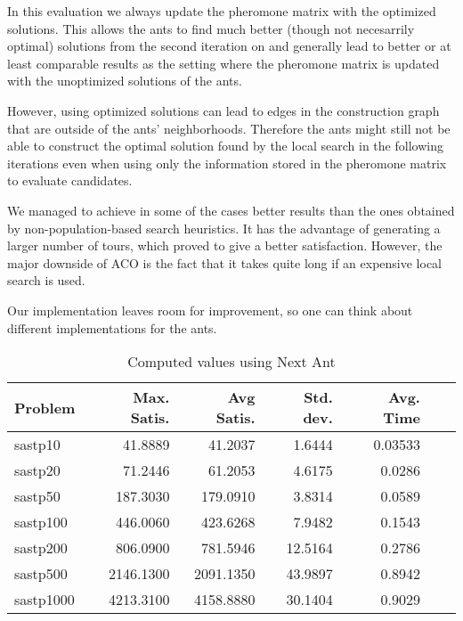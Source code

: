 \documentclass{article}
\begin{document}
In this evaluation we always update the pheromone matrix with the optimized solutions. This allows the ants to find much better (though not
necesarrily optimal) solutions from the second iteration on and generally lead to better or at least comparable results as the setting where
the pheromone matrix is updated with the unoptimized solutions of the ants.

However, using optimized solutions can lead to edges in the construction graph that are outside of the ants' neighborhoods. Therefore the
ants might still not be able to construct the optimal solution found by the local search in the following iterations even when using only
the information stored in the pheromone matrix to evaluate candidates.
\medskip

We managed to achieve in some of the cases better results than the ones obtained by non-population-based search heuristics. 
It has the advantage of generating a larger number of tours, which proved to give a better satisfaction. 
However, the major downside of ACO is the fact that it takes quite long if an expensive local search is used.

Our implementation leaves room for improvement, so one can think about different implementations for the ants. 



\begin{table}[b!]
  \vspace{-6mm}%
  \caption{Computed values using Next Ant }
  \label{tab:conf1}
  \setlength{\tabcolsep}{1.4mm}
  \centering
  \begin{tabular}{lrrrrrr}
    \bfseries Problem & 
    \bfseries Max. Satis. &
    \bfseries Avg Satis. &
    \bfseries Std. dev. &
    \bfseries Avg. Time 
    \\\hline
    sastp10 & 41.8889 & 41.2037 & 1.6444 & 0.03533 \\ 
	sastp20 & 71.2446 & 61.2053 & 4.6175 & 0.0286 \\ 
	sastp50 & 187.3030 & 179.0910 & 3.8314 & 0.0589 \\ 
	sastp100 & 446.0060 & 423.6268 & 7.9482 & 0.1543 \\ 
	sastp200 & 806.0900 & 781.5946 & 12.5164 & 0.2786 \\ 
	sastp500 & 2146.1300 & 2091.1350 & 43.9897 & 0.8942 \\ 
	sastp1000 & 4213.3100 & 4158.8880 & 30.1404 & 0.9029 
    \\\hline
  \end{tabular}

\end{table}
\end{document}
